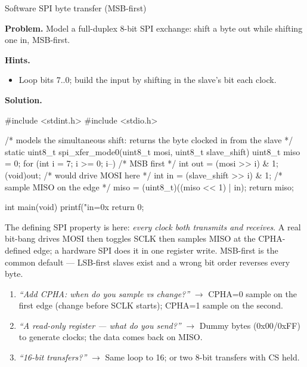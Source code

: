 \begin{gymproblem}{Software SPI byte transfer (MSB-first)}

\textbf{Problem.} Model a full-duplex 8-bit SPI exchange: shift a byte out
while shifting one in, MSB-first.

\textbf{Hints.}
\begin{itemize}
\item Loop bits 7..0; build the input by shifting in the slave's bit each clock.
\end{itemize}

\attempt

\textbf{Solution.}
\begin{cgym}
#include <stdint.h>
#include <stdio.h>

/* models the simultaneous shift: returns the byte clocked in from the slave */
static uint8_t spi_xfer_mode0(uint8_t mosi, uint8_t slave_shift) {
    uint8_t miso = 0;
    for (int i = 7; i >= 0; i--) {        /* MSB first */
        int out = (mosi >> i) & 1; (void)out;   /* would drive MOSI here */
        int in  = (slave_shift >> i) & 1;       /* sample MISO on the edge */
        miso = (uint8_t)((miso << 1) | in);
    }
    return miso;
}

int main(void) {
    printf("in=0x%
    return 0;
}
\end{cgym}

The defining SPI property is here: \emph{every clock both transmits and
receives}. A real bit-bang drives MOSI then toggles SCLK then samples MISO at
the CPHA-defined edge; a hardware SPI does it in one register write. MSB-first
is the common default --- LSB-first slaves exist and a wrong bit order reverses
every byte.

\followups
\begin{enumerate}
\item \emph{``Add CPHA: when do you sample vs change?''} $\rightarrow$ CPHA=0
  sample on the first edge (change before SCLK starts); CPHA=1 sample on the
  second.
\item \emph{``A read-only register --- what do you send?''} $\rightarrow$ Dummy
  bytes (0x00/0xFF) to generate clocks; the data comes back on MISO.
\item \emph{``16-bit transfers?''} $\rightarrow$ Same loop to 16; or two 8-bit
  transfers with CS held.
\end{enumerate}
\end{gymproblem}

